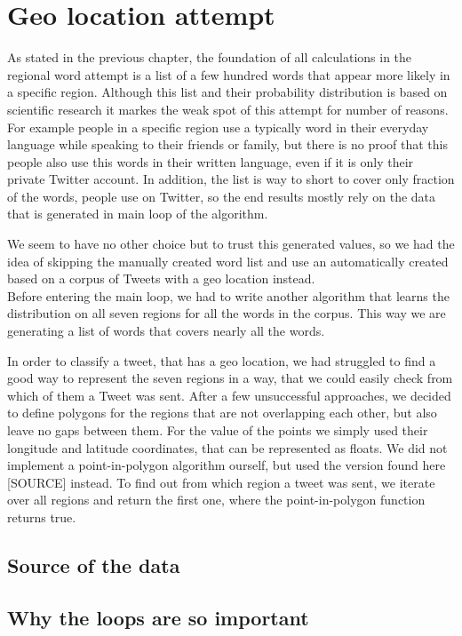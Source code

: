 \documentclass[../Main.tex]{subfiles}
\begin{document}
\section{Geo location attempt }
As stated in the previous chapter, the foundation of all calculations in the regional word attempt is a list of a few hundred words that appear more likely in a specific region. 
Although this list and their probability distribution is based on scientific research it markes the weak spot of this attempt for number of reasons. For example people in a specific region use a typically word in their everyday language while speaking to their friends or family, but there is no proof that this people also use this words in their written language, even if it is only their private Twitter account. In addition, the list is way to short to cover only fraction of the words, people use on Twitter, so the end results mostly rely on the data that is generated in main loop of the algorithm.

We seem to have no other choice but to trust this generated values, so we had the idea of skipping the manually created word list and use an automatically created based on a corpus of Tweets with a geo location instead. \\
Before entering the main loop, we had to write another algorithm that learns the distribution on all seven regions for all the words in the corpus. This way we are generating a list of words that covers nearly all the words.

In order to classify a tweet, that has a geo location, we had struggled to find a good way to represent the seven regions in a way, that we could easily check from which of them a Tweet was sent. After a few unsuccessful approaches, we decided to define polygons for the regions that are not overlapping each other, but also leave no gaps between them. For the value of the points we simply used their longitude and latitude coordinates, that can be represented as floats.  
We did not implement a point-in-polygon algorithm ourself, but used the version found here [SOURCE] instead. 
To find out from which region a tweet was sent, we iterate over all regions and return the first one, where the point-in-polygon function returns true.


\newpage


\subsection{Source of the data}
\subsection{Why the loops are so important}
\end{document}

